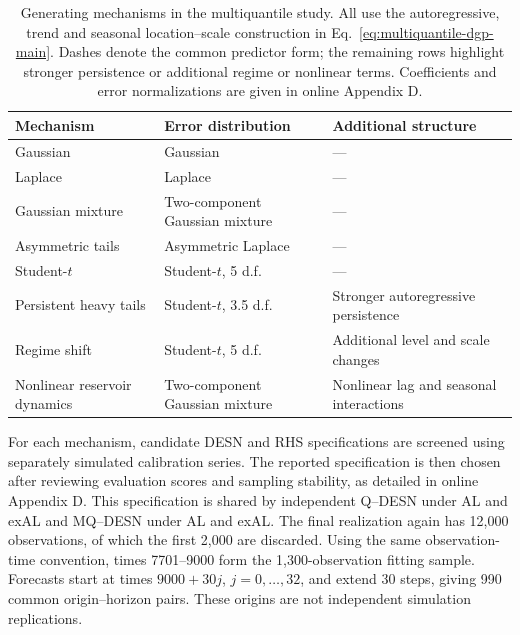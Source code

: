 \documentclass[12pt,letterpaper]{article}
\numberwithin{equation}{section}
\begin{document}
\begin{table}[!htbp]
\centering
\small
\caption{Generating mechanisms in the multiquantile study. All use the
autoregressive, trend and seasonal location--scale construction in
Eq.~\eqref{eq:multiquantile-dgp-main}. Dashes denote the common predictor
form; the remaining rows highlight stronger persistence or additional
regime or nonlinear terms. Coefficients and error normalizations are given
in online Appendix D.}
\label{tab:multiquantile-generating-mechanisms}
\begin{tabularx}{\textwidth}{@{}
>{\raggedright\arraybackslash}p{}
>{\raggedright\arraybackslash}p{}Y@{}}
\toprule
Mechanism & Error distribution & Additional structure \\
\midrule
Gaussian & Gaussian & --- \\
Laplace & Laplace & --- \\
Gaussian mixture & Two-component Gaussian mixture & --- \\
Asymmetric tails & Asymmetric Laplace & --- \\
Student-\(t\) & Student-\(t\), 5 d.f. & --- \\
Persistent heavy tails & Student-\(t\), 3.5 d.f.
  & Stronger autoregressive persistence \\
Regime shift & Student-\(t\), 5 d.f.
  & Additional level and scale changes \\
Nonlinear reservoir dynamics & Two-component Gaussian mixture
  & Nonlinear lag and seasonal interactions \\
\bottomrule
\end{tabularx}
\end{table}

For each mechanism, candidate DESN and RHS specifications are screened using
separately simulated calibration series. The reported specification is then
chosen after reviewing evaluation scores and sampling stability, as detailed
in online Appendix D. This specification is shared by independent Q--DESN
under AL and exAL and MQ--DESN under AL and exAL. The final
realization again has 12,000
observations, of which the first 2,000 are discarded. Using the same
observation-time convention, times 7701--9000 form the 1,300-observation fitting
sample. Forecasts start at times \(9000+30j\), \(j=0,\ldots,32\), and extend 30 steps,
giving 990 common origin--horizon pairs. These origins are not independent
simulation replications.
\end{document}
